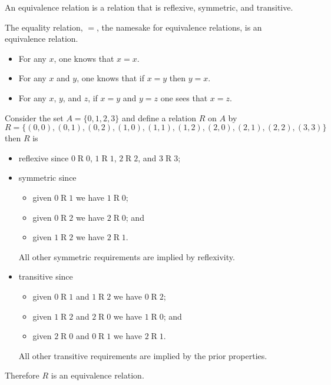 \begin{definition}
    An equivalence relation is a relation that is reflexive, symmetric, and transitive.
\end{definition}

\begin{example}
    The equality relation, $=$, the namesake for equivalence relations, is an equivalence relation.
    \begin{itemize}
        \item For any $x$, one knows that $x = x$.
        \item For any $x$ and $y$, one knows that if $x = y$ then $y = x$.
        \item For any $x$, $y$, and $z$, if $x = y$ and $y = z$ one sees that $x = z$.
    \end{itemize}
\end{example}

\begin{example}
    Consider the set $A = \{0, 1, 2, 3\}$ and define a relation $R$ on $A$ by
    \[
        R = \{(0, 0), (0, 1), (0, 2), (1, 0), (1, 1), (1, 2), (2, 0), (2, 1), (2, 2), (3, 3)\}
    \]
    then $R$ is
    \begin{itemize}
        \item reflexive since $0\mathrel{R}0$, $1\mathrel{R}1$, $2\mathrel{R}2$, and $3\mathrel{R}3$;
        \item symmetric since
        \begin{itemize}
            \item given $0\mathrel{R}1$ we have $1\mathrel{R}0$;
            \item given $0\mathrel{R}2$ we have $2\mathrel{R}0$; and
            \item given $1\mathrel{R}2$ we have $2\mathrel{R}1$.
        \end{itemize}
        All other symmetric requirements are implied by reflexivity.
        \item transitive since
        \begin{itemize}
            \item given $0\mathrel{R}1$ and $1\mathrel{R}2$ we have $0\mathrel{R}2$;
            \item given $1\mathrel{R}2$ and $2\mathrel{R}0$ we have $1\mathrel{R}0$; and
            \item given $2\mathrel{R}0$ and $0\mathrel{R}1$ we have $2\mathrel{R}1$. 
        \end{itemize}
        All other transitive requirements are implied by the prior properties.
    \end{itemize}
    Therefore $R$ is an equivalence relation.
\end{example}

